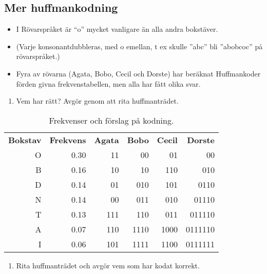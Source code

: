 \subsection{Mer huffmankodning}

\begin{frame}
  \begin{exercise}
    \begin{itemize}
      \item I Rövarspråket är \enquote{o}  mycket vanligare än alla andra 
        bokstäver.
      \item (Varje konsonantdubbleras, med o emellan, t ex skulle ”abc” bli 
        ”abobcoc” på rövarspråket.)
      \item Fyra av rövarna (Agata, Bobo, Cecil och Dorste) har beräknat 
        Huffmankoder förden givna frekvenstabellen, men alla har fått olika 
        svar.
    \end{itemize}
    \begin{enumerate}
      \item Vem har rätt? Avgör genom att rita huffmanträdet.
    \end{enumerate}
  \end{exercise}
\end{frame}

\begin{frame}
  \begin{table}
    \begin{tabular}{rrrrrr}
      \textbf{Bokstav} & \textbf{Frekvens}
          & \textbf{Agata} & \textbf{Bobo} & \textbf{Cecil} & \textbf{Dorste}
          \\
      O & 0.30 & 11 & 00 & 01 & 00 \\
      B & 0.16 & 10 & 10 & 110  & 010 \\
      D & 0.14 & 01 & 010 & 101 & 0110 \\
      N & 0.14 & 00 & 011 & 010 & 01110 \\
      T & 0.13 & 111 & 110 & 011 & 011110 \\
      A & 0.07 & 110 & 1110 & 1000 & 0111110 \\
      I & 0.06 & 101 & 1111 & 1100 & 0111111
    \end{tabular}
    \caption{Frekvenser och förslag på kodning.}
  \end{table}

  \begin{exercise}
    \begin{enumerate}
      \item Rita huffmanträdet och avgör vem som har kodat korrekt.
    \end{enumerate}
  \end{exercise}
\end{frame}

